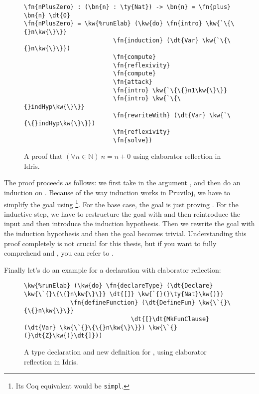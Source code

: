 \begin{figure}[ht]
  \caption{A proof that $(\forall n \in \mathbb{N})\ n = n + 0$ using elaborator reflection in Idris.}
\begin{Verbatim}[framesep=2mm, label=\footnotesize{\normalfont{Idris}}, labelposition=topline]
\fn{nPlusZero} : (\bn{n} : \ty{Nat}) -> \bn{n} = \fn{plus} \bn{n} \dt{0}
\fn{nPlusZero} = \kw{%runElab} (\kw{do} \fn{intro} \kw{`\{\{}n\kw{\}\}}
                         \fn{induction} (\dt{Var} \kw{`\{\{}n\kw{\}\}})
                         \fn{compute}
                         \fn{reflexivity}
                         \fn{compute}
                         \fn{attack}
                         \fn{intro} \kw{`\{\{}n1\kw{\}\}}
                         \fn{intro} \kw{`\{\{}indHyp\kw{\}\}}
                         \fn{rewriteWith} (\dt{Var} \kw{`\{\{}indHyp\kw{\}\}})
                         \fn{reflexivity}
                         \fn{solve})
\end{Verbatim}
\end{figure}

The proof proceeds as follows: we first take in the argument , and then do
an induction on . Because of the way induction works in Pruviloj, we have
to simplify the goal using \footnote{Its Coq equivalent would be
\texttt{simpl}.}.
For the base case, the goal is just proving  \ty{=} .
For the inductive step, we have to restructure the goal with  and
then reintroduce the input and then introduce the induction hypothesis. Then we
rewrite the goal with the induction hypothesis and then the goal becomes
trivial. Understanding this proof completely is not crucial for this thesis,
but if you want to fully comprehend  and , you can refer to
\citet{elabref}.

Finally let's do an example for a declaration with elaborator reflection:

\begin{figure}[ht]
  \caption{A type declaration and new definition for , using elaborator reflection in Idris.}
\begin{Verbatim}[framesep=2mm, label=\footnotesize{\normalfont{Idris}}, labelposition=topline]
\kw{%runElab} (\kw{do} \fn{declareType} (\dt{Declare} \kw{\`{}\{\{}n\kw{\}\}} \dt{[]} \kw{`{}(}\ty{Nat}\kw{)})
             \fn{defineFunction} (\dt{DefineFun} \kw{\`{}\{\{}n\kw{\}\}}
                              \dt{[}\dt{MkFunClause} (\dt{Var} \kw{\`{}\{\{}n\kw{\}\}}) \kw{\`{}(}\dt{Z}\kw{)}\dt{]}))
\end{Verbatim}
\end{figure}

